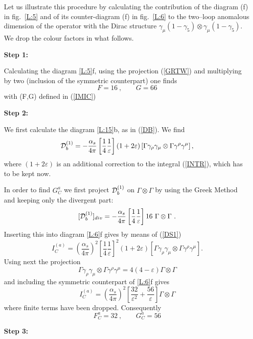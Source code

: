 \documentclass[12pt]{article}
\def\as{\alpha_s}
\newcommand{\be}{\begin{equation}}
\newcommand{\ee}{\end{equation}}
\begin{document}
\begin{itemize}
\begin{itemize}
Let us illustrate this procedure by calculating the contribution 
of the diagram (f) in fig.~\ref{L:5} and of its counter-diagram (f)
in fig.~\ref{L:6} to the two--loop anomalous dimension of the
operator with the Dirac structure 
$\gamma_\mu(1-\gamma_5)\otimes\gamma_\mu(1-\gamma_5)$.
We drop the colour factors in what follows.

{\bf Step 1:}

Calculating the diagram \ref{L:5}f, using the projection
(\ref{GRTW}) and multiplying by two (inclusion of the symmetric
counterpart) one finds \cite{WEISZ}
\be\label{66}
F=16~, \quad\quad G=66
\ee
with (F,G) defined in (\ref{IMIC})

{\bf Step 2:}

We first calculate the diagram \ref{L:15}b, as in (\ref{DB}).
We find
\be\label{DS1}
{\cal D}^{(1)}_b=-\frac{\as}{4\pi}
\left[\frac{1}{4}\frac{1}{\varepsilon}\right]
(1+2\varepsilon)
\left[\Gamma\gamma_\rho\gamma_\mu\otimes\Gamma\gamma^\rho\gamma^\mu\right],
\ee
where $(1+2\varepsilon)$ is an additional correction to the integral
(\ref{INTR}), which has to be kept now.

In order to find $G^a_C$ we first project ${\cal D}^{(1)}_b$
on $\Gamma\otimes\Gamma$ by using the Greek Method and keeping
only the divergent part:
\be\label{DS2}
[{\cal D}^{(1)}_b]_{div}=-\frac{\as}{4\pi}
\left[\frac{1}{4}\frac{1}{\varepsilon}\right] 16~\Gamma\otimes\Gamma~.
\ee
Inserting this into diagram \ref{L:6}f gives by means of (\ref{DS1})
\be\label{DS3}
I^{(a)}_C=\left(\frac{\as}{4\pi}\right)^2
\left[\frac{1}{4}\frac{1}{\varepsilon}\right]^2
(1+2\varepsilon)
\left[\Gamma\gamma_\rho\gamma_\mu\otimes\Gamma\gamma^\rho\gamma^\mu\right].
\ee
Using next the projection
\be\label{DS4}
\Gamma\gamma_\rho\gamma_\mu\otimes\Gamma\gamma^\rho\gamma^\mu=
4(4-\varepsilon) \Gamma\otimes\Gamma
\ee
and including the symmetric counterpart of \ref{L:6}f gives
\be\label{DS5}
I^{(a)}_C=\left(\frac{\as}{4\pi}\right)^2
\left[\frac{32}{\varepsilon^2}+\frac{56}{\varepsilon}\right]
\Gamma\otimes\Gamma
\ee
where finite terms have been dropped. Consequently
\be\label{DS6}
F_C^a=32~, \quad\quad G_C^a=56
\ee

{\bf Step 3:}


\end{itemize}
\end{itemize}
\end{document}
